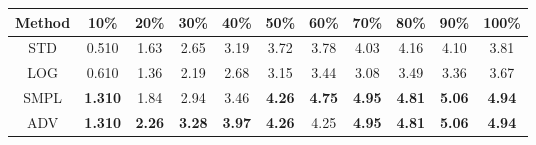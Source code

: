 \documentclass{standalone}
\begin{document}
\begin{tabular}{c|cccccccccc}
      \toprule
      Method & 10\% & 20\% & 30\% & 40\% & 50\% & 60\% & 70\% & 80\% & 90\% & 100\% \\
      \midrule
STD & 0.510 & 1.63 & 2.65 & 3.19 & 3.72 & 3.78 & 4.03 & 4.16 & 4.10 & 3.81\\
LOG & 0.610 & 1.36 & 2.19 & 2.68 & 3.15 & 3.44 & 3.08 & 3.49 & 3.36 & 3.67\\
SMPL & \textbf{1.310} & 1.84 & 2.94 & 3.46 & \textbf{4.26} & \textbf{4.75} & \textbf{4.95} & \textbf{4.81} & \textbf{5.06} & \textbf{4.94}\\
ADV & \textbf{1.310} & \textbf{2.26} & \textbf{3.28} & \textbf{3.97} & \textbf{4.26} & 4.25 & \textbf{4.95} & \textbf{4.81} & \textbf{5.06} & \textbf{4.94}\\
  \bottomrule
\end{tabular}
\end{document}
